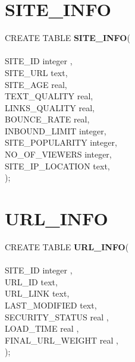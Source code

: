 \documentclass{scrreprt}
\begin{document}
\section{SITE_INFO}


CREATE TABLE \textbf{SITE_INFO}(\\ \\
    SITE_ID	 \hspace{15pt}        	        integer , \\
	SITE_URL 	   \hspace{15pt}     text,\\
	SITE_AGE	    \hspace{15pt}     real,\\
	TEXT_QUALITY	\hspace{15pt}         real,\\
	LINKS_QUALITY	\hspace{15pt}         real,\\
	BOUNCE_RATE     \hspace{15pt}        real,\\	   
  	INBOUND_LIMIT   \hspace{15pt}         integer,\\
  	SITE_POPULARITY   \hspace{15pt}      integer,\\
 	NO_OF_VIEWERS     \hspace{15pt}    integer,\\
	SITE_IP_LOCATION  \hspace{15pt}     text,\\
);


\section{ URL_INFO}

CREATE TABLE  \textbf{URL_INFO}(\\ \\	  
    SITE_ID   	\hspace{15pt}        integer , \\
	URL_ID    \hspace{15pt}	        text,\\
	URL_LINK \hspace{15pt}	        text,\\
	LAST_MODIFIED	  \hspace{15pt}      text,\\
	SECURITY_STATUS  \hspace{15pt}     real ,\\
	LOAD_TIME        \hspace{15pt}        real ,\\	  
	FINAL_URL_WEIGHT \hspace{15pt}        real ,\\	 
  	);
\end{document}
